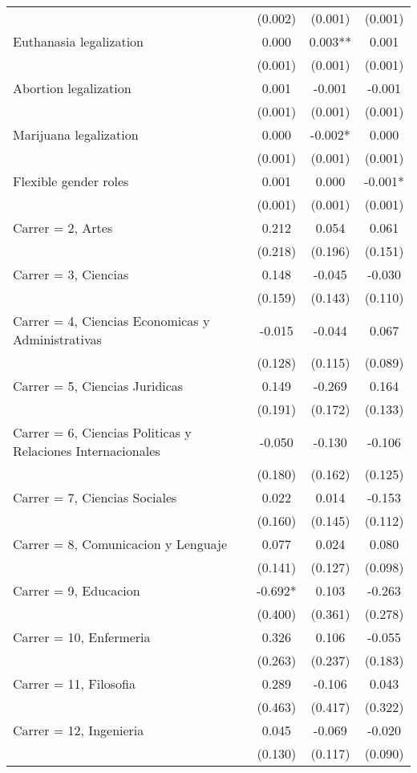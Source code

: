 \documentclass[]{article}
\begin{document}
\begin{tabular}{lccc}
 & (0.002) & (0.001) & (0.001) \\
Euthanasia legalization & 0.000 & 0.003** & 0.001 \\
 & (0.001) & (0.001) & (0.001) \\
Abortion legalization & 0.001 & -0.001 & -0.001 \\
 & (0.001) & (0.001) & (0.001) \\
Marijuana legalization & 0.000 & -0.002* & 0.000 \\
 & (0.001) & (0.001) & (0.001) \\
Flexible gender roles & 0.001 & 0.000 & -0.001* \\
 & (0.001) & (0.001) & (0.001) \\
Carrer = 2, Artes & 0.212 & 0.054 & 0.061 \\
 & (0.218) & (0.196) & (0.151) \\
Carrer = 3, Ciencias & 0.148 & -0.045 & -0.030 \\
 & (0.159) & (0.143) & (0.110) \\
Carrer = 4, Ciencias Economicas y Administrativas & -0.015 & -0.044 & 0.067 \\
 & (0.128) & (0.115) & (0.089) \\
Carrer = 5, Ciencias Juridicas & 0.149 & -0.269 & 0.164 \\
 & (0.191) & (0.172) & (0.133) \\
Carrer = 6, Ciencias Politicas y Relaciones Internacionales & -0.050 & -0.130 & -0.106 \\
 & (0.180) & (0.162) & (0.125) \\
Carrer = 7, Ciencias Sociales & 0.022 & 0.014 & -0.153 \\
 & (0.160) & (0.145) & (0.112) \\
Carrer = 8, Comunicacion y Lenguaje & 0.077 & 0.024 & 0.080 \\
 & (0.141) & (0.127) & (0.098) \\
Carrer = 9, Educacion & -0.692* & 0.103 & -0.263 \\
 & (0.400) & (0.361) & (0.278) \\
Carrer = 10, Enfermeria & 0.326 & 0.106 & -0.055 \\
 & (0.263) & (0.237) & (0.183) \\
Carrer = 11, Filosofia & 0.289 & -0.106 & 0.043 \\
 & (0.463) & (0.417) & (0.322) \\
Carrer = 12, Ingenieria & 0.045 & -0.069 & -0.020 \\
 & (0.130) & (0.117) & (0.090) \\

\end{tabular}
\end{document}
